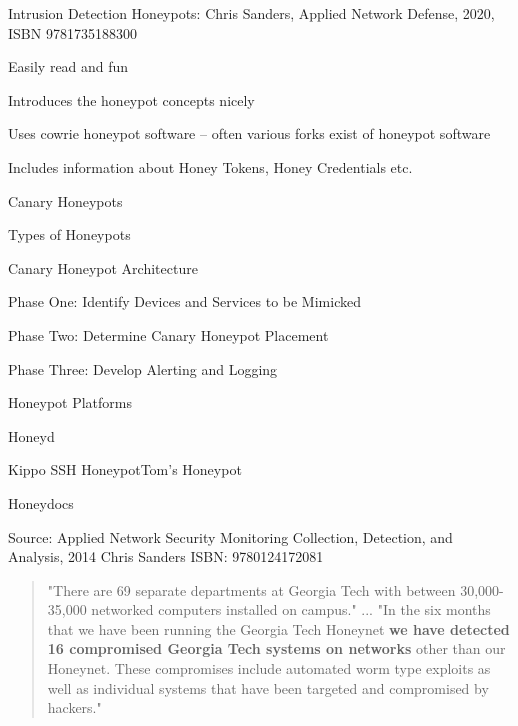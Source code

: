 \documentclass[Screen16to9,17pt]{foils}
\begin{document}
Intrusion Detection Honeypots: Chris Sanders, Applied Network Defense, 2020, ISBN 9781735188300


\begin{list2}
\item Easily read and fun
\item Introduces the honeypot concepts nicely
\item Uses cowrie honeypot software -- often various forks exist of honeypot software
\item Includes information about Honey Tokens, Honey Credentials etc.
\end{list2}




\begin{list1}
\item Canary Honeypots
\item Types of Honeypots
\item Canary Honeypot Architecture
\begin{list2}
\item Phase One: Identify Devices and Services to be Mimicked
\item Phase Two: Determine Canary Honeypot Placement
\item Phase Three: Develop Alerting and Logging
\end{list2}
\item Honeypot Platforms
\begin{list2}
\item Honeyd
\item Kippo SSH HoneypotTom’s Honeypot
\item Honeydocs
\end{list2}
\end{list1}

Source: Applied Network Security Monitoring Collection, Detection, and Analysis, 2014 Chris Sanders ISBN: 9780124172081


\begin{quote}
\small
"There are 69 separate departments at Georgia Tech with between 30,000-35,000
networked computers installed on campus."
...
"In the six months that we have been running the Georgia
Tech Honeynet {\bfseries we have detected 16 compromised
Georgia Tech systems on networks} other than our
Honeynet. These compromises include automated worm
type exploits as well as individual systems that have been
targeted and compromised by hackers."
\end{quote}
\end{document}
